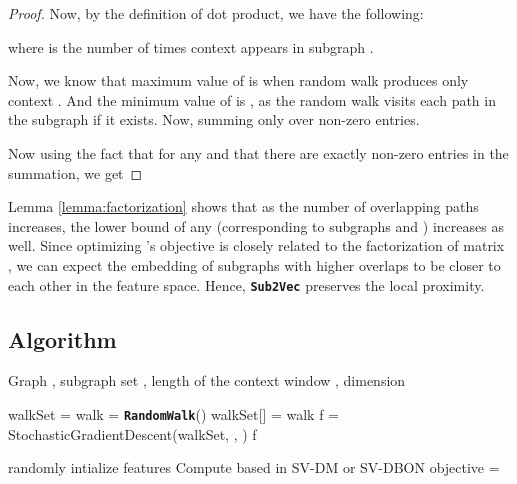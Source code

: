 \documentclass[sigconf]{acmart}
\newcommand{\alg}{{\bf {\tt Sub2Vec}}\xspace}
\newcommand{\randomwalk}{{\bf {\tt RandomWalk}}\xspace}
\begin{document}
\begin{proof}
Now, by the definition of dot product, we have the following:

where  is the number of times context  appears in subgraph .

Now, we know that maximum value of  is  when random walk produces only context . And the minimum value of  is , as the random walk visits each path in the subgraph if it exists. Now, summing only over non-zero entries.



Now using the fact that  for any  and that there are exactly  non-zero entries in the summation, we get


\end{proof}

Lemma \ref{lemma:factorization} shows that as the number of overlapping paths increases, the lower bound of any  (corresponding to subgraphs  and ) increases as well. Since optimizing 's objective is closely related to the factorization of matrix , we can expect the embedding of subgraphs with higher overlaps to be closer to each other in the feature space. Hence, \alg preserves the local proximity.


\subsection{Algorithm}

\begin{algorithm}
\caption{\alg}
\label{alg:alg}
\begin{algorithmic} [1]
\REQUIRE Graph , subgraph set , length of the context window , dimension 

\STATE walkSet =  
	\STATE walk = \randomwalk()
	\STATE walkSet[] = walk
\ENDFOR
\STATE f = StochasticGradientDescent(walkSet, , ) 
\RETURN f
\end{algorithmic}
\end{algorithm}



\begin{algorithm}
\caption{\alg : StochasticGradientDescent(walkSet, , ) }
\label{alg:alg2}
\begin{algorithmic} [1]
\STATE randomly intialize features 
 \STATE Compute  based in SV-DM or SV-DBON objective
\STATE  = 
\ENDFOR
\ENDFOR
\end{algorithmic}
\end{algorithm}
\end{document}
